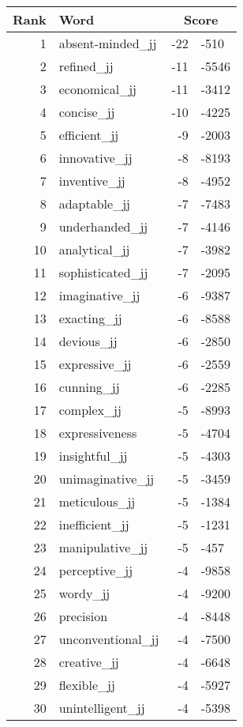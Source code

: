 \begin{longtable}[!htbp]{| rlr@{.}l |}
    \hline
    \textbf{Rank} & \textbf{Word} & \multicolumn{2}{c|}{\textbf{Score}} \\
    \hline
    \endhead
    1 & absent-minded\_jj & -22 & -510 \\
    2 & refined\_jj & -11 & -5546 \\
    3 & economical\_jj & -11 & -3412 \\
    4 & concise\_jj & -10 & -4225 \\
    5 & efficient\_jj & -9 & -2003 \\
    6 & innovative\_jj & -8 & -8193 \\
    7 & inventive\_jj & -8 & -4952 \\
    8 & adaptable\_jj & -7 & -7483 \\
    9 & underhanded\_jj & -7 & -4146 \\
    10 & analytical\_jj & -7 & -3982 \\
    11 & sophisticated\_jj & -7 & -2095 \\
    12 & imaginative\_jj & -6 & -9387 \\
    13 & exacting\_jj & -6 & -8588 \\
    14 & devious\_jj & -6 & -2850 \\
    15 & expressive\_jj & -6 & -2559 \\
    16 & cunning\_jj & -6 & -2285 \\
    17 & complex\_jj & -5 & -8993 \\
    18 & expressiveness & -5 & -4704 \\
    19 & insightful\_jj & -5 & -4303 \\
    20 & unimaginative\_jj & -5 & -3459 \\
    21 & meticulous\_jj & -5 & -1384 \\
    22 & inefficient\_jj & -5 & -1231 \\
    23 & manipulative\_jj & -5 & -457 \\
    24 & perceptive\_jj & -4 & -9858 \\
    25 & wordy\_jj & -4 & -9200 \\
    26 & precision & -4 & -8448 \\
    27 & unconventional\_jj & -4 & -7500 \\
    28 & creative\_jj & -4 & -6648 \\
    29 & flexible\_jj & -4 & -5927 \\
    30 & unintelligent\_jj & -4 & -5398 \\

\end{longtable}
